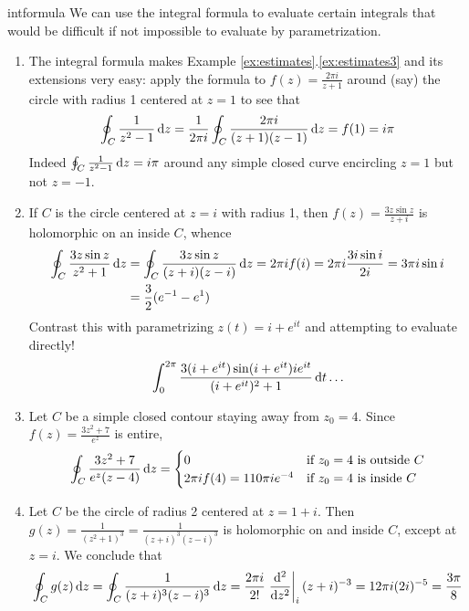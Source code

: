 \goodbreak






\begin{examples}{}{intformula}
	We can use the integral formula to evaluate certain integrals that would be difficult if not impossible to evaluate by parametrization.
	\begin{enumerate}
	  \item The integral formula makes Example \ref*{ex:estimates}.\ref{ex:estimates3} and its extensions very easy: apply the formula to $f(z)=\frac{2\pi i}{z+1}$ around (say) the circle with radius 1 centered at $z=1$ to see that
  	\[
  		\oint_C \frac 1{z^2-1}\,\dz =\frac 1{2\pi i}\oint_C \frac{2\pi i}{(z+1)(z-1)}\,\dz =f(1) =i\pi 
  	\]
  	Indeed $\oint_C \frac 1{z^2-1}\,\dz =i\pi$ around any simple closed curve encircling $z=1$ but not $z=-1$.
	  
	  \item If $C$ is the circle centered at $z=i$ with radius 1, then $f(z)=\frac{3z\sin z}{z+i}$ is holomorphic on an inside $C$, whence
	  \begin{align*}
	  	\oint_C\frac{3z\sin z}{z^2+1}\,\dz 
	  	&=\oint_C\frac{3z\sin z}{(z+i)(z-i)}\,\dz
	  	=2\pi if(i)
	  	=2\pi i\frac{3i\sin i}{2i}
	  	=3\pi i\sin i\\
	  	&=\frac 32(e^{-1}-e^1)
	  \end{align*}
	  Contrast this with parametrizing $z(t)=i+e^{it}$ and attempting to evaluate directly!
 	  \[
 	  	\int_0^{2\pi}\frac{3(i+e^{it})\sin(i+e^{it})ie^{it}}{(i+e^{it})^2+1}\,\dt\ldots
	  \]
	  
	  \item Let $C$ be a simple closed contour staying away from $z_0=4$. Since $f(z)=\frac{3z^2+7}{e^z}$ is entire,
	  \[
	  	\oint_C\frac{3z^2+7}{e^z(z-4)}\,\dz=
	  	\begin{cases}
	  		0&\text{if $z_0=4$ is outside $C$}\\
	  		2\pi if(4)=110\pi ie^{-4}&\text{if $z_0=4$ is inside $C$}
	  	\end{cases}
	  \]
	  
	  \item Let $C$ be the circle of radius 2 centered at $z=1+i$. Then $g(z)=\frac 1{(z^2+1)^3}=\frac 1{(z+i)^3(z-i)^3}$ is holomorphic on and inside $C$, except at $z=i$. We conclude that
	  \[
	  	\oint_Cg(z)\,\dz=\oint_C\frac 1{(z+i)^3(z-i)^3}\,\dz=\frac{2\pi i}{2!}\diffat[^2]{z^2}{i}(z+i)^{-3} =12\pi i(2i)^{-5} =\frac{3\pi}{8}
	  \]
	\end{enumerate}
\end{examples}

